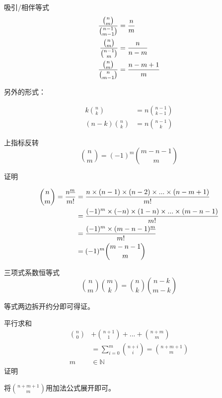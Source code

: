 \documentclass[UTF8]{beamer}
\begin{document}
    \begin{frame}
      \begin{block}{吸引/相伴等式}
        $$
        \begin{aligned}
        {{n \choose m} \over {n-1 \choose m-1}}&={{n} \over {m}} \\
        {{n \choose m} \over {n-1 \choose m}}&={{n} \over {n-m}} \\
        {{n \choose m} \over {n \choose m-1}}&={{n-m+1} \over {m}} \\
        \end{aligned}
        $$

        \pause
        另外的形式：

        $$
        \begin{aligned}
        k {n \choose k}&=n {n-1 \choose k-1} \\
        (n-k){n \choose k}&=n{n-1 \choose k}
        \end{aligned}
        $$
      \end{block}
    \end{frame}

    \begin{frame}
      \begin{block}{上指标反转}
        $$
        {n \choose m}=(-1)^m{m-n-1 \choose m}
        $$
      \end{block}
      \pause
      证明

      $$
      \begin{aligned}
      {n \choose m}={n^{\underline{m}} \over m!}&={n\times(n-1)\times (n-2)\times...\times (n-m+1) \over m!} \\
      &={(-1)^m\times (-n)\times(1-n)\times...\times(m-n-1) \over m!} \\
      &={(-1)^m\times (m-n-1)^{\underline{m}} \over m!} \\
      &=(-1)^m{m-n-1 \choose m}
      \end{aligned}
      $$
    \end{frame}

    \begin{frame}
      \begin{block}{三项式系数恒等式}
        $$
        {n \choose m}{m \choose k}={n \choose k}{n-k \choose m-k}
        $$

        等式两边拆开约分即可得证。
      \end{block}
      \pause
      \begin{block}{平行求和}
        $$
        \begin{aligned}
        {n \choose 0}&+{n+1 \choose 1}+...+{n+m \choose m} \\
        &=\sum\limits_{i=0}^{m}{n+i \choose i}={n+m+1 \choose m} \\
        m &\in \mathbb{N}
        \end{aligned}
        $$
        \pause
        证明

        将${n+m+1 \choose m}$用加法公式展开即可。
      \end{block}
    \end{frame}
\end{document}
